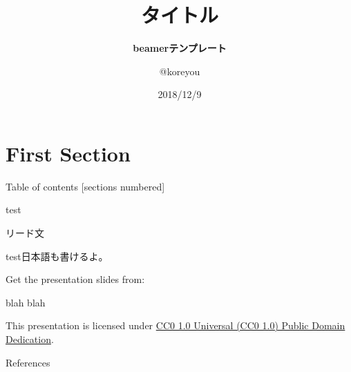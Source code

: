 

\title{\bfseries タイトル}
\subtitle{\bfseries beamerテンプレート}
\author{@koreyou}
\date[]{2018/12/9}




\frame{\titlepage}

\section{First Section}
\frame[standout]{\insertsection}

\begin{frame}{Table of contents}
  [sections numbered]
  \tableofcontents[hideallsubsections]
\end{frame}

\begin{frame}{test}
  \begin{lead}
    リード文
  \end{lead}
  test\cite{knuth}日本語も書けるよ。
\end{frame}

\begin{frame}[c]

  Get the presentation slides from:

  \begin{center}blah blah\end{center}

  This presentation is licensed under
    \href{https://creativecommons.org/publicdomain/zero/1.0/}{
    CC0 1.0 Universal (CC0 1.0) Public Domain Dedication}.

  \begin{center}\cczero\end{center}

\end{frame}

\begin{frame}[allowframebreaks]{References}
  \printbibliography[heading=none]
\end{frame}



